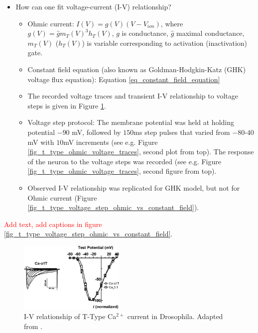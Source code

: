 \documentclass[../../workflow.tex]{subfiles}
\begin{document}
\begin{itemize}
    \item How can one fit voltage-current (I-V) relationship?
    \begin{itemize}
        \item Ohmic current: $I(V) = g(V) (V - V_{ion})$, where $g(V) = \hat{g} m_T(V)^3 h_T(V)$, $g$ is conductance,
        $\hat{g}$ maximal conductance, $m_T(V)$ ($h_T(V)$) is variable corresponding to
        activation (inactivation) gate.
        \item Constant field equation (also known as Goldman-Hodgkin-Katz (GHK) voltage flux equation): Equation \ref{eq_constant_field_equation}
        \item The recorded voltage traces and transient I-V relationship to voltage steps is given in Figure \ref{fig:i_v_relationship_jeong}.
        \item Voltage step protocol: The membrane potential was held at holding potential $-90$ mV,
        followed by $150$ms step pulses that varied from $-80$-$40$mV with $10$mV increments
        (see e.g. Figure \ref{fig_t_type_ohmic_voltage_traces}, second plot from top). The response
        of the neuron to the voltage steps was recorded (see e.g. Figure \ref{fig_t_type_ohmic_voltage_traces}, second figure from top).
        \item Observed I-V relationship was replicated for GHK model, but not for Ohmic current
        (Figure \ref{fig_t_type_voltage_step_ohmic_vs_constant_field}).
    \end{itemize}
\end{itemize}

\color{black}

\textcolor{red}{Add text, add captions in figure \ref{fig_t_type_voltage_step_ohmic_vs_constant_field}}.

\begin{figure}[H]
    \centering
    \includegraphics[width=0.45\textwidth]{./img/t_type_calcium_channel/iv_relationship_jeong_2015.png}
    \caption{I-V relationship of T-Type Ca$^{2+}$ current in Drosophila. Adapted from \parencite{jeongCaa1TFlyTtype2015}.}
    \label{fig:i_v_relationship_jeong}
\end{figure}
\end{document}
